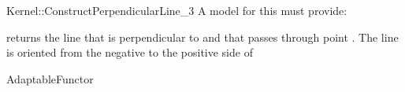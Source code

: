 \begin{ccRefFunctionObjectConcept}{Kernel::ConstructPerpendicularLine_3}
A model for this must provide:


       {returns the line that is perpendicular to  and that
        passes through point . The line is oriented from
        the negative to the positive side of }

\ccRefines
AdaptableFunctor

\ccSeeAlso
{} \\

\end{ccRefFunctionObjectConcept}
